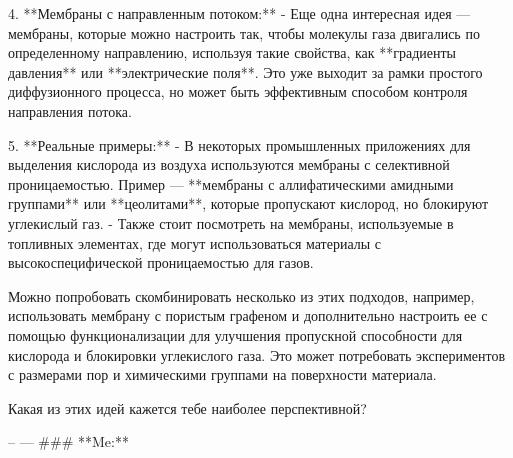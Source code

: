 4. **Мембраны с направленным потоком:**
   -  Еще одна интересная идея — мембраны, которые можно настроить так, чтобы молекулы газа двигались по определенному направлению, используя такие свойства, как **градиенты давления** или **электрические поля**. Это уже выходит за рамки простого диффузионного процесса, но может быть эффективным способом контроля направления потока.

5. **Реальные примеры:**
   - В некоторых промышленных приложениях для выделения кислорода из воздуха используются мембраны с селективной проницаемостью. Пример — **мембраны с аллифатическими амидными группами** или **цеолитами**, которые пропускают кислород, но блокируют углекислый газ.
   - Также стоит посмотреть на мембраны, используемые в топливных элементах, где могут использоваться материалы с высокоспецифической проницаемостью для газов.

Можно попробовать скомбинировать несколько из этих подходов, например, использовать мембрану с пористым графеном и дополнительно настроить ее с помощью функционализации для улучшения пропускной способности для кислорода и блокировки углекислого газа. Это может потребовать экспериментов с размерами пор и химическими группами на поверхности материала.

Какая из этих идей кажется тебе наиболее перспективной?

--  
---  
### **Me:** 


